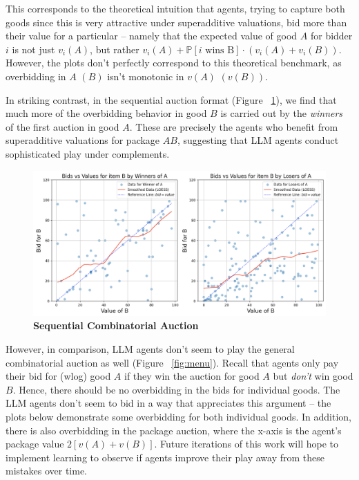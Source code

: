 \documentclass{article} %
\begin{document}
This corresponds to the theoretical intuition that agents, trying to capture both goods since this is very attractive under superadditive valuations, bid more than their value for a particular -- namely that the expected value of good $A$ for bidder $i$ is not just $v_i(A)$, but rather $v_i(A) + \mathbb{P}[\text{$i$ wins B}]\cdot(v_i(A) + v_i(B))$. 
However, the plots don't perfectly correspond to this theoretical benchmark, as overbidding in $A$ $(B)$ isn't monotonic in $v(A)$ $(v(B))$.


In striking contrast, in the sequential auction format (Figure ~\ref{fig:sequ}), we find that much more of the overbidding behavior in good $B$ is carried out by the \textit{ winners} of the first auction in good $A$. 
These are precisely the agents who benefit from superadditive valuations for package $AB$, suggesting that LLM agents conduct sophisticated play under complements. 
\begin{figure}[h!]
    \centering \includegraphics[width=0.9\linewidth]{Figs/Sequ.png}
    \caption{\textbf{Sequential Combinatorial Auction} }
    \label{fig:sequ}
\end{figure}

However, in comparison, LLM agents don't seem to play the general combinatorial auction as well (Figure ~\ref{fig:menu}). 
Recall that agents only pay their bid for (wlog) good $A$ if they win the auction for good $A$ but \textit{don't} win good $B$.
Hence, there should be no overbidding in the bids for individual goods. 
The LLM agents don't seem to bid in a way that appreciates this argument -- the plots below demonstrate some overbidding for both individual goods. 
In addition, there is also overbidding in the package auction, where the x-axis is the agent's package value $2[v(A) + v(B)]$. 
Future iterations of this work will hope to implement learning to observe if agents improve their play away from these mistakes over time.
\end{document}
